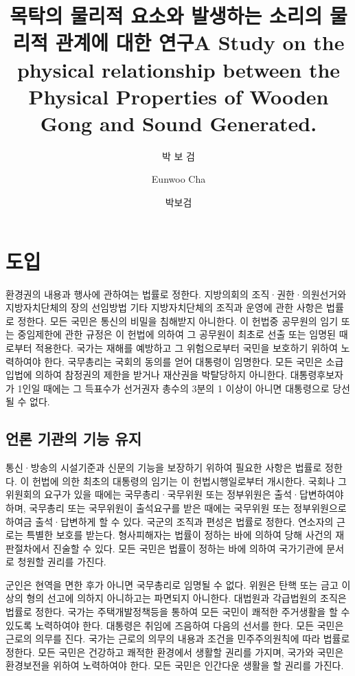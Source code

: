 \documentclass[doctor, korean]{pnuthesis}
\title[korean]{목탁의 물리적 요소와 발생하는 소리의 물리적 관계에 대한 연구}
\title[english]{A Study on the physical relationship between the Physical Properties of Wooden Gong and Sound Generated.}
\author[korean]{박 보 검}
\author[english]{Eunwoo Cha}
\author[nospace]{박보검}
\begin{document}
\renewcommand{\baselinestretch}{1.5}    %
\selectfont                             %

\changepage{5mm}{}{}{}{}{}{}{}{-5mm}    %
\makelists   %



\chapter{도입}

환경권의 내용과 행사에 관하여는 법률로 정한다. 지방의회의 조직·권한·의원선거와 지방자치단체의 장의 선임방법 기타 지방자치단체의 조직과 운영에 관한 사항은 법률로 정한다. 모든 국민은 통신의 비밀을 침해받지 아니한다. 이 헌법중 공무원의 임기 또는 중임제한에 관한 규정은 이 헌법에 의하여 그 공무원이 최초로 선출 또는 임명된 때로부터 적용한다. 국가는 재해를 예방하고 그 위험으로부터 국민을 보호하기 위하여 노력하여야 한다. 국무총리는 국회의 동의를 얻어 대통령이 임명한다. 모든 국민은 소급입법에 의하여 참정권의 제한을 받거나 재산권을 박탈당하지 아니한다. 대통령후보자가 1인일 때에는 그 득표수가 선거권자 총수의 3분의 1 이상이 아니면 대통령으로 당선될 수 없다.

\section{언론 기관의 기능 유지}

통신·방송의 시설기준과 신문의 기능을 보장하기 위하여 필요한 사항은 법률로 정한다. 이 헌법에 의한 최초의 대통령의 임기는 이 헌법시행일로부터 개시한다. 국회나 그 위원회의 요구가 있을 때에는 국무총리·국무위원 또는 정부위원은 출석·답변하여야 하며, 국무총리 또는 국무위원이 출석요구를 받은 때에는 국무위원 또는 정부위원으로 하여금 출석·답변하게 할 수 있다. 국군의 조직과 편성은 법률로 정한다. 연소자의 근로는 특별한 보호를 받는다. 형사피해자는 법률이 정하는 바에 의하여 당해 사건의 재판절차에서 진술할 수 있다. 모든 국민은 법률이 정하는 바에 의하여 국가기관에 문서로 청원할 권리를 가진다.

군인은 현역을 면한 후가 아니면 국무총리로 임명될 수 없다. 위원은 탄핵 또는 금고 이상의 형의 선고에 의하지 아니하고는 파면되지 아니한다. 대법원과 각급법원의 조직은 법률로 정한다. 국가는 주택개발정책등을 통하여 모든 국민이 쾌적한 주거생활을 할 수 있도록 노력하여야 한다. 대통령은 취임에 즈음하여 다음의 선서를 한다. 모든 국민은 근로의 의무를 진다. 국가는 근로의 의무의 내용과 조건을 민주주의원칙에 따라 법률로 정한다. 모든 국민은 건강하고 쾌적한 환경에서 생활할 권리를 가지며, 국가와 국민은 환경보전을 위하여 노력하여야 한다. 모든 국민은 인간다운 생활을 할 권리를 가진다.
\end{document}
